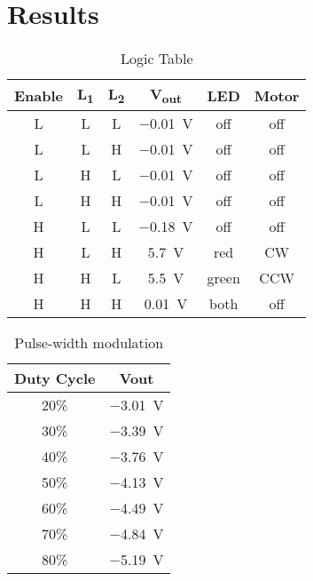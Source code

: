 \section{Results}
\label{sec:results}

\begin{table}[hbtp]
  \centering
  \begin{tabular}{ccc|ccc}
    Enable & \si{L_1} & \si{L_2} & \si{V_{out}} & LED & Motor \\
    \hline
    L & L & L & \SI{-0.01}{V} & off & off \\
    L & L & H & \SI{-0.01}{V} & off & off \\
    L & H & L & \SI{-0.01}{V} & off & off \\
    L & H & H & \SI{-0.01}{V} & off & off \\
    H & L & L & \SI{-0.18}{V} & off & off \\
    H & L & H & \SI{+5.7}{V} & red & CW \\
    H & H & L & \SI{+5.5}{V} & green & CCW \\
    H & H & H & \SI{+0.01}{V} & both & off \\
  \end{tabular}
  \caption{\label{tab:logic} Logic Table}
\end{table}

\begin{table}[hbtp]
  \centering
  \begin{tabular}{cc}
    Duty Cycle & Vout \\
    \hline
    20\% & \SI{-3.01}{V} \\
    30\% & \SI{-3.39}{V} \\
    40\% & \SI{-3.76}{V} \\
    50\% & \SI{-4.13}{V} \\
    60\% & \SI{-4.49}{V} \\
    70\% & \SI{-4.84}{V} \\
    80\% & \SI{-5.19}{V} \\
  \end{tabular}
  \caption{\label{tab:duty} Pulse-width modulation}
\end{table}



